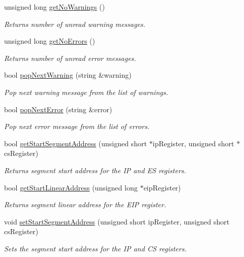 \begin{DoxyCompactItemize}
\item 
unsigned long \hyperlink{classintelhex_a05a19e1e9f1eb493a8d0bc29db88683f}{get\-No\-Warnings} ()
\begin{DoxyCompactList}\small\item\em Returns number of unread warning messages. \end{DoxyCompactList}\item 
unsigned long \hyperlink{classintelhex_a77cddd46c3f97692b4d89f138bdabb72}{get\-No\-Errors} ()
\begin{DoxyCompactList}\small\item\em Returns number of unread error messages. \end{DoxyCompactList}\item 
bool \hyperlink{classintelhex_ab881b8cb0fe665395a29e4375db8f7c4}{pop\-Next\-Warning} (string \&warning)
\begin{DoxyCompactList}\small\item\em Pop next warning message from the list of warnings. \end{DoxyCompactList}\item 
bool \hyperlink{classintelhex_a6609fd1c57a650c45a1961f6318d643e}{pop\-Next\-Error} (string \&error)
\begin{DoxyCompactList}\small\item\em Pop next error message from the list of errors. \end{DoxyCompactList}\item 
bool \hyperlink{classintelhex_a94d6d17ba22263a4775d80b2a0e6e95f}{get\-Start\-Segment\-Address} (unsigned short $\ast$ip\-Register, unsigned short $\ast$cs\-Register)
\begin{DoxyCompactList}\small\item\em Returns segment start address for the I\-P and E\-S registers. \end{DoxyCompactList}\item 
bool \hyperlink{classintelhex_a7bc61f72756d37509e768906733ba10b}{get\-Start\-Linear\-Address} (unsigned long $\ast$eip\-Register)
\begin{DoxyCompactList}\small\item\em Returns segment linear address for the E\-I\-P register. \end{DoxyCompactList}\item 
void \hyperlink{classintelhex_a9688f0002be870b05d64b5f9fcdeb86b}{set\-Start\-Segment\-Address} (unsigned short ip\-Register, unsigned short cs\-Register)
\begin{DoxyCompactList}\small\item\em Sets the segment start address for the I\-P and C\-S registers. \end{DoxyCompactList}\item 

\end{DoxyCompactItemize}
